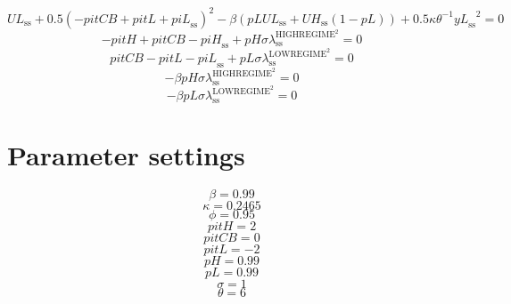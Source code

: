 \begin{equation}
{U\!L}_\mathrm{ss} + 0.5\left(-{p\!i\!t\!C\!B} + {p\!i\!t\!L} + {p\!i\!L}_\mathrm{ss}\right)^{2} - {\beta} \left({{p\!L}} {{U\!L}_\mathrm{ss}} + {{U\!H}_\mathrm{ss}} \left(1 - {p\!L}\right)\right) + 0.5{\kappa} {\theta}^{-1} {{y\!L}_\mathrm{ss}}^{2} = 0
\end{equation}
\begin{equation}
-{p\!i\!t\!H} + {p\!i\!t\!C\!B} - {p\!i\!H}_\mathrm{ss} + {{p\!H}} {\sigma} {\lambda^{\mathrm{HIGHREGIME}^{\mathrm{2}}}_\mathrm{ss}} = 0
\end{equation}
\begin{equation}
{p\!i\!t\!C\!B} - {p\!i\!t\!L} - {p\!i\!L}_\mathrm{ss} + {{p\!L}} {\sigma} {\lambda^{\mathrm{LOWREGIME}^{\mathrm{2}}}_\mathrm{ss}} = 0
\end{equation}
\begin{equation}
-{\beta} {{p\!H}} {\sigma} {\lambda^{\mathrm{HIGHREGIME}^{\mathrm{2}}}_\mathrm{ss}} = 0
\end{equation}
\begin{equation}
-{\beta} {{p\!L}} {\sigma} {\lambda^{\mathrm{LOWREGIME}^{\mathrm{2}}}_\mathrm{ss}} = 0
\end{equation}






\section{Parameter settings}

\begin{equation}
\beta = 0.99
\end{equation}
\begin{equation}
\kappa = 0.2465
\end{equation}
\begin{equation}
\phi = 0.95
\end{equation}
\begin{equation}
{p\!i\!t\!H} = 2
\end{equation}
\begin{equation}
{p\!i\!t\!C\!B} = 0
\end{equation}
\begin{equation}
{p\!i\!t\!L} = -2
\end{equation}
\begin{equation}
{p\!H} = 0.99
\end{equation}
\begin{equation}
{p\!L} = 0.99
\end{equation}
\begin{equation}
\sigma = 1
\end{equation}
\begin{equation}
\theta = 6
\end{equation}



